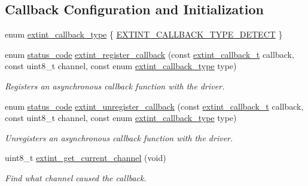 \subsection*{Callback Configuration and Initialization}
\begin{DoxyCompactItemize}
\item 
enum \mbox{\hyperlink{group__asfdoc__sam0__extint__group_gaf22af5117db5d011b371b05dfa8b50e3}{extint\+\_\+callback\+\_\+type}} \{ \mbox{\hyperlink{group__asfdoc__sam0__extint__group_ggaf22af5117db5d011b371b05dfa8b50e3ac2e35708fbb9eb31b2a664817f108b2d}{E\+X\+T\+I\+N\+T\+\_\+\+C\+A\+L\+L\+B\+A\+C\+K\+\_\+\+T\+Y\+P\+E\+\_\+\+D\+E\+T\+E\+CT}}
 \}
\item 
enum \mbox{\hyperlink{group__group__sam0__utils__status__codes_ga751c892e5a46b8e7d282085a5a5bf151}{status\+\_\+code}} \mbox{\hyperlink{group__asfdoc__sam0__extint__group_gae1bedc3fd379b3dd62f88efb17a2758f}{extint\+\_\+register\+\_\+callback}} (const \mbox{\hyperlink{group__asfdoc__sam0__extint__group_ga0faa88198c196060baeecb40061daaa5}{extint\+\_\+callback\+\_\+t}} callback, const uint8\+\_\+t channel, const enum \mbox{\hyperlink{group__asfdoc__sam0__extint__group_gaf22af5117db5d011b371b05dfa8b50e3}{extint\+\_\+callback\+\_\+type}} type)
\begin{DoxyCompactList}\small\item\em Registers an asynchronous callback function with the driver. \end{DoxyCompactList}\item 
enum \mbox{\hyperlink{group__group__sam0__utils__status__codes_ga751c892e5a46b8e7d282085a5a5bf151}{status\+\_\+code}} \mbox{\hyperlink{group__asfdoc__sam0__extint__group_ga47bd63b128d0b1799ef0386355f85f77}{extint\+\_\+unregister\+\_\+callback}} (const \mbox{\hyperlink{group__asfdoc__sam0__extint__group_ga0faa88198c196060baeecb40061daaa5}{extint\+\_\+callback\+\_\+t}} callback, const uint8\+\_\+t channel, const enum \mbox{\hyperlink{group__asfdoc__sam0__extint__group_gaf22af5117db5d011b371b05dfa8b50e3}{extint\+\_\+callback\+\_\+type}} type)
\begin{DoxyCompactList}\small\item\em Unregisters an asynchronous callback function with the driver. \end{DoxyCompactList}\item 
uint8\+\_\+t \mbox{\hyperlink{group__asfdoc__sam0__extint__group_ga1a7c8127569a9f83447f463bccd932a4}{extint\+\_\+get\+\_\+current\+\_\+channel}} (void)
\begin{DoxyCompactList}\small\item\em Find what channel caused the callback. \end{DoxyCompactList}\end{DoxyCompactItemize}
